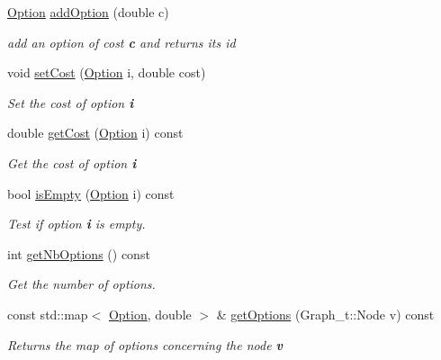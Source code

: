 \begin{DoxyCompactItemize}
\hyperlink{class_restoration_plan2_aff164a2726831342bf87af5e11df1064}{Option} \hyperlink{class_restoration_plan2_a7461e5c0cd622f9e6adbf38f34753a07}{add\+Option} (double c)
\begin{DoxyCompactList}\small\item\em add an option of cost {\bfseries c} and returns its id \end{DoxyCompactList}\item 
void \hyperlink{class_restoration_plan2_aea25e41ec7132080a756a57cde477c65}{set\+Cost} (\hyperlink{class_restoration_plan2_aff164a2726831342bf87af5e11df1064}{Option} i, double cost)
\begin{DoxyCompactList}\small\item\em Set the cost of option {\bfseries i} \end{DoxyCompactList}\item 
double \hyperlink{class_restoration_plan2_abac73d19450c44e9a96ab8ef680af044}{get\+Cost} (\hyperlink{class_restoration_plan2_aff164a2726831342bf87af5e11df1064}{Option} i) const
\begin{DoxyCompactList}\small\item\em Get the cost of option {\bfseries i} \end{DoxyCompactList}\item 
bool \hyperlink{class_restoration_plan2_af4810bc9bb239488322ab53b72c30a44}{is\+Empty} (\hyperlink{class_restoration_plan2_aff164a2726831342bf87af5e11df1064}{Option} i) const
\begin{DoxyCompactList}\small\item\em Test if option {\bfseries i} is empty. \end{DoxyCompactList}\item 
int \hyperlink{class_restoration_plan2_a0c69c9a149143042a88408abefe8f005}{get\+Nb\+Options} () const
\begin{DoxyCompactList}\small\item\em Get the number of options. \end{DoxyCompactList}\item 
const std\+::map$<$ \hyperlink{class_restoration_plan2_aff164a2726831342bf87af5e11df1064}{Option}, double $>$ \& \hyperlink{class_restoration_plan2_ad5677cfb92c07bdfa6c3414940ae6401}{get\+Options} (Graph\+\_\+t\+::\+Node v) const
\begin{DoxyCompactList}\small\item\em Returns the map of options concerning the node {\bfseries v} \end{DoxyCompactList}\item 

\end{DoxyCompactItemize}
